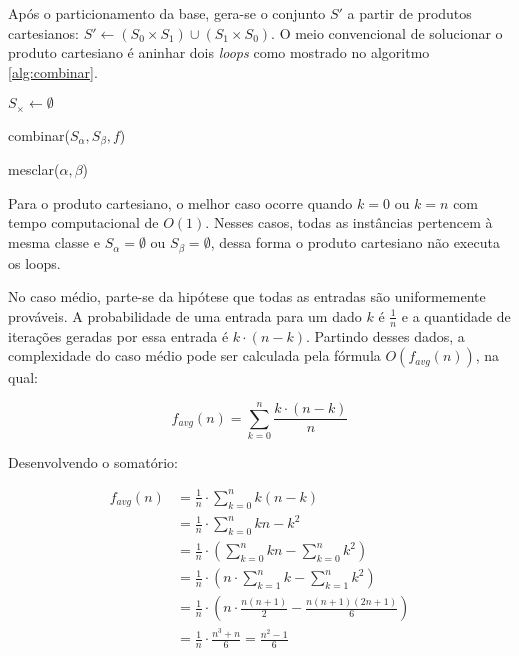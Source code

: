 Após o particionamento da base, gera-se o conjunto $S'$ a partir de produtos cartesianos: $S' \gets (S_0 \times S_1) \cup (S_1 \times S_0)$. O meio convencional de solucionar o produto cartesiano é aninhar dois \emph{loops} como mostrado no algoritmo \ref{alg:combinar}.

\begin{function}

    $S_{\times} \gets \emptyset$



    \caption{combinar($S_{\alpha}, S_{\beta}, f$)}
    \label{alg:combinar}
\end{function}

\begin{function}


    \caption{mesclar($\alpha, \beta$)}
    \label{alg:mesclar}
\end{function}

Para o produto cartesiano, o melhor caso ocorre quando $k = 0$ ou $k = n$ com tempo computacional de $O(1)$. Nesses casos, todas as instâncias pertencem à mesma classe e $S_{\alpha} = \emptyset$ ou $S_{\beta} = \emptyset$, dessa forma o produto cartesiano não executa os loops.

No caso médio, parte-se da hipótese que todas as entradas são uniformemente prováveis. A probabilidade de uma entrada para um dado $k$ é $\frac{1}{n}$ e a quantidade de iterações geradas por essa entrada é $k \cdot (n - k)$. Partindo desses dados, a complexidade do caso médio pode ser calculada pela fórmula $O(f_{avg}(n))$, na qual:

\[f_{avg}(n) = \sum_{k = 0}^{n} \frac{k \cdot (n - k)}{n}\]

Desenvolvendo o somatório:

\begin{align*}
    f_{avg}(n) &= \frac{1}{n} \cdot \sum_{k = 0}^{n} k(n - k) \\
               &= \frac{1}{n} \cdot \sum_{k = 0}^{n} kn - k^2 \\
               &= \frac{1}{n} \cdot \left(\sum_{k = 0}^{n} kn - \sum_{k = 0}^{n} k^2\right) \\
               &= \frac{1}{n} \cdot \left(n \cdot \sum_{k = 1}^{n} k - \sum_{k = 1}^{n} k^2\right) \\
               &= \frac{1}{n} \cdot \left(n \cdot \frac{n(n + 1)}{2} - \frac{n(n + 1)(2n + 1)}{6}\right) \\
               &= \frac{1}{n} \cdot \frac{n^3 + n}{6} = \frac{n^2 -1}{6}
\end{align*}

